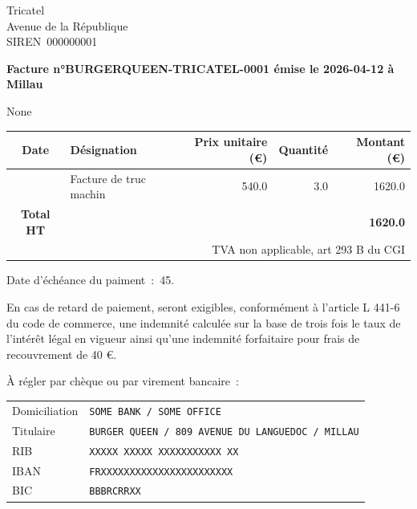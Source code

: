\documentclass[11pt,a4paper]{scrlttr2}
\begin{document}
\begin{letter}{%
    Tricatel\\%
    Avenue de la République\\%
    SIREN~000000001%
  }
  \opening{\textbf{Facture n°BURGERQUEEN-TRICATEL-0001 émise le 2026-04-12 à Millau}}
  None

  \begin{tabularx}{\textwidth}{cXrrr}
    \toprule
    \textbf{Date}       & \textbf{Désignation}       & \textbf{Prix unitaire (€)} & \textbf{Quantité} & \textbf{Montant (€)}     \\
    \midrule
     & Facture de truc machin & 540.0          & 3.0  & 1620.0             \\
    \addlinespace
    \textbf{Total HT}   &                            &                            &                   & \textbf{1620.0} \\
    \bottomrule
    \multicolumn{5}{r}{\small{TVA non applicable, art 293 B du CGI}}                                                             \\
  \end{tabularx}

  Date d'échéance du paiment~:~45.

  En cas de retard de paiement, seront exigibles, conformément à l’article L 441-6 du code de commerce,
  une indemnité calculée sur la base de trois fois le taux de l’intérêt légal en vigueur ainsi qu’une indemnité
  forfaitaire pour frais de recouvrement de 40 €.

  À régler par chèque ou par virement bancaire~:

  \begin{tabular}{ll}
    Domiciliation & \texttt{SOME BANK / SOME OFFICE}  \\
    Titulaire     & \texttt{BURGER QUEEN / 809 AVENUE DU LANGUEDOC / MILLAU} \\
    RIB           & \texttt{XXXXX XXXXX XXXXXXXXXXX XX}           \\
    IBAN          & \texttt{FRXXXXXXXXXXXXXXXXXXXXXXX}                  \\
    BIC           & \texttt{BBBRCRRXX}                   \\
  \end{tabular}
\end{letter}
\end{document}

